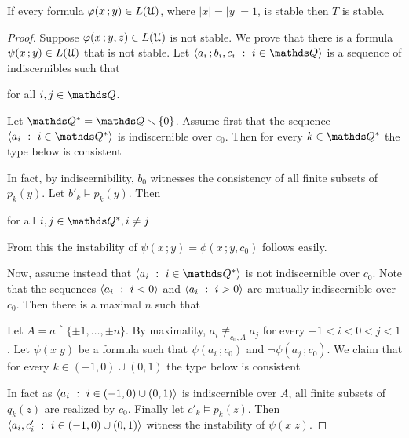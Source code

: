 \begin{theorem}
  If every formula $\varphi(x\,;y)\in L(\EuScript U)$, where $|x|=|y|=1$, is stable then $T$ is stable.
\end{theorem}

\begin{proof}
  Suppose $\varphi(x\,;y,z)\in L(\EuScript U)$ is not stable.
  We prove that there is a formula $\psi(x\,;y)\in L(\EuScript U)$ that is not stable.
  Let $\<a_i\,;b_i,c_i\ :\ i\in\QQ\>$ is a sequence of indiscernibles such that 

  \hfill for all $i,j\in\QQ$.

  Let $\QQ^*=\QQ\sm\{0\}$.
  Assume first that the sequence $\<a_i\ :\ i\in\QQ^*\>$ is indiscernible over $c_0$.
  Then for every $k\in\QQ^*$ the type below is consistent


  In fact, by indiscernibility, $b_0$ witnesses the consistency of all finite subsets of $p_k(y)$.
  Let $b'_k\models p_k(y)$.
  Then

  \hfill for all $i,j\in\QQ^*, i\neq j$

  From this the instability of $\psi(x\,;y)=\phi(x\,;y,c_0)$ follows easily.

  Now, assume instead that $\<a_i\ :\ i\in\QQ^*\>$ is not indiscernible over $c_0$.
  Note that the sequences $\<a_i\ :\ i<0\>$ and $\<a_i\ :\ i>0\>$ are mutually indiscernible over $c_0$.
  Then there is a maximal $n$ such that


  Let $A=a\restriction\{\pm1,\dots,\pm n\}$.
  By maximality, $a_i\nequiv_{c_0,A}a_j$ for every $-1<i<0<j<1$.
  Let $\psi(x\;y)$ be a formula such that $\psi(a_i\,;c_0)$ and $\neg\psi(a_j\,;c_0)$.
  We claim that for every $k\in(-1,0)\cup(0,1)$ the type below is consistent


  In fact as $\<a_i\ :\ i\in(-1,0)\cup(0,1)\>$ is indiscernible over $A$, all finite subsets of $q_k(z)$ are realized by $c_0$.
  Finally let $c'_k\models p_k(z)$.
  Then $\<a_i,c'_i\ :\ i\in(-1,0)\cup(0,1)\>$ witness the instability of $\psi(x\;z)$.
\end{proof}

